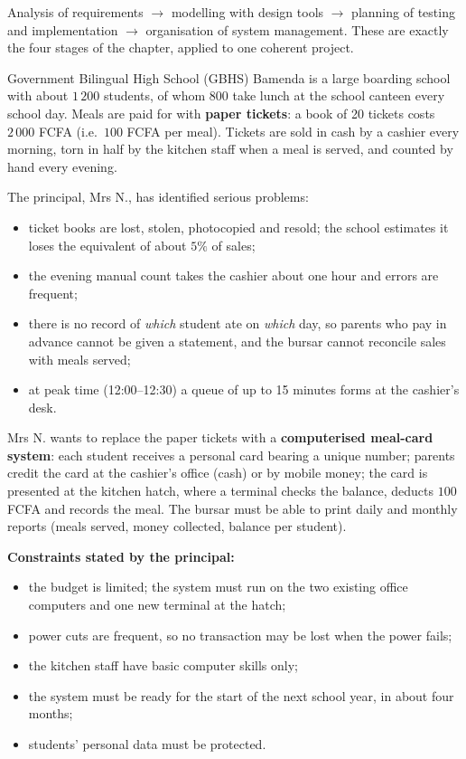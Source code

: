 \documentclass[11pt]{article}
\newcounter{popsec}
\newcounter{popsub}
\newcommand{\courssub}[1]{%
  \stepcounter{popsub}%
  \par\vspace{9pt}\noindent{\popxbold\fontsize{11.5}{13}\selectfont\color{popink}{\color{poporange}\thepopsec.\thepopsub}\hspace{6pt}#1}\par\nopagebreak\vspace{4pt}
}
\begin{document}
\begin{aretenir}
Analysis of requirements $\rightarrow$ modelling with design tools $\rightarrow$ planning of testing and implementation $\rightarrow$ organisation of system management. These are exactly the four stages of the chapter, applied to one coherent project.
\end{aretenir}

\courssub{Situation}

Government Bilingual High School (GBHS) Bamenda is a large boarding school with about $1\,200$ students, of whom $800$ take lunch at the school canteen every school day. Meals are paid for with \textbf{paper tickets}: a book of 20 tickets costs $2\,000$ FCFA (i.e.\ $100$ FCFA per meal). Tickets are sold in cash by a cashier every morning, torn in half by the kitchen staff when a meal is served, and counted by hand every evening.

The principal, Mrs N., has identified serious problems:

\begin{itemize}
\item ticket books are lost, stolen, photocopied and resold; the school estimates it loses the equivalent of about $5\%$ of sales;
\item the evening manual count takes the cashier about one hour and errors are frequent;
\item there is no record of \emph{which} student ate on \emph{which} day, so parents who pay in advance cannot be given a statement, and the bursar cannot reconcile sales with meals served;
\item at peak time (12:00--12:30) a queue of up to 15 minutes forms at the cashier's desk.
\end{itemize}

Mrs N. wants to replace the paper tickets with a \textbf{computerised meal-card system}: each student receives a personal card bearing a unique number; parents credit the card at the cashier's office (cash) or by mobile money; the card is presented at the kitchen hatch, where a terminal checks the balance, deducts $100$ FCFA and records the meal. The bursar must be able to print daily and monthly reports (meals served, money collected, balance per student).

\textbf{Constraints stated by the principal:}

\begin{itemize}
\item the budget is limited; the system must run on the two existing office computers and one new terminal at the hatch;
\item power cuts are frequent, so no transaction may be lost when the power fails;
\item the kitchen staff have basic computer skills only;
\item the system must be ready for the start of the next school year, in about four months;
\item students' personal data must be protected.
\end{itemize}
\end{document}
